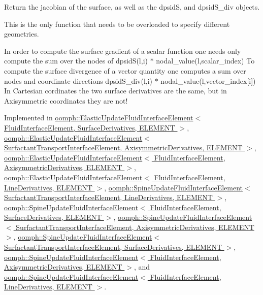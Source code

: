 Return the jacobian of the surface, as well as the dpsidS, and dpsid\+S\+\_\+div objects.

This is the only function that needs to be overloaded to specify different geometries.

In order to compute the surface gradient of a scalar function one needs only compute the sum over the nodes of dpsid\+S(l,i) $\ast$ nodal\+\_\+value(l,scalar\+\_\+index) To compute the surface divergence of a vector quantity one computes a sum over nodes and coordinate directions dpsid\+S\+\_\+div(l,i) $\ast$ nodal\+\_\+value(l,vector\+\_\+index\mbox{[}i\mbox{]}) In Cartesian cordinates the two surface derivatives are the same, but in Axisymmetric coordinates they are not! 

Implemented in \hyperlink{classoomph_1_1ElasticUpdateFluidInterfaceElement_ae9df6c11ccb63dc04c0d5ca655fe1482}{oomph\+::\+Elastic\+Update\+Fluid\+Interface\+Element$<$ Fluid\+Interface\+Element, Surface\+Derivatives, E\+L\+E\+M\+E\+N\+T $>$}, \hyperlink{classoomph_1_1ElasticUpdateFluidInterfaceElement_ae9df6c11ccb63dc04c0d5ca655fe1482}{oomph\+::\+Elastic\+Update\+Fluid\+Interface\+Element$<$ Surfactant\+Transport\+Interface\+Element, Axisymmetric\+Derivatives, E\+L\+E\+M\+E\+N\+T $>$}, \hyperlink{classoomph_1_1ElasticUpdateFluidInterfaceElement_ae9df6c11ccb63dc04c0d5ca655fe1482}{oomph\+::\+Elastic\+Update\+Fluid\+Interface\+Element$<$ Fluid\+Interface\+Element, Axisymmetric\+Derivatives, E\+L\+E\+M\+E\+N\+T $>$}, \hyperlink{classoomph_1_1ElasticUpdateFluidInterfaceElement_ae9df6c11ccb63dc04c0d5ca655fe1482}{oomph\+::\+Elastic\+Update\+Fluid\+Interface\+Element$<$ Fluid\+Interface\+Element, Line\+Derivatives, E\+L\+E\+M\+E\+N\+T $>$}, \hyperlink{classoomph_1_1SpineUpdateFluidInterfaceElement_a75debcd348674d5ea58bfefc0e72b737}{oomph\+::\+Spine\+Update\+Fluid\+Interface\+Element$<$ Surfactant\+Transport\+Interface\+Element, Line\+Derivatives, E\+L\+E\+M\+E\+N\+T $>$}, \hyperlink{classoomph_1_1SpineUpdateFluidInterfaceElement_a75debcd348674d5ea58bfefc0e72b737}{oomph\+::\+Spine\+Update\+Fluid\+Interface\+Element$<$ Fluid\+Interface\+Element, Surface\+Derivatives, E\+L\+E\+M\+E\+N\+T $>$}, \hyperlink{classoomph_1_1SpineUpdateFluidInterfaceElement_a75debcd348674d5ea58bfefc0e72b737}{oomph\+::\+Spine\+Update\+Fluid\+Interface\+Element$<$ Surfactant\+Transport\+Interface\+Element, Axisymmetric\+Derivatives, E\+L\+E\+M\+E\+N\+T $>$}, \hyperlink{classoomph_1_1SpineUpdateFluidInterfaceElement_a75debcd348674d5ea58bfefc0e72b737}{oomph\+::\+Spine\+Update\+Fluid\+Interface\+Element$<$ Surfactant\+Transport\+Interface\+Element, Surface\+Derivatives, E\+L\+E\+M\+E\+N\+T $>$}, \hyperlink{classoomph_1_1SpineUpdateFluidInterfaceElement_a75debcd348674d5ea58bfefc0e72b737}{oomph\+::\+Spine\+Update\+Fluid\+Interface\+Element$<$ Fluid\+Interface\+Element, Axisymmetric\+Derivatives, E\+L\+E\+M\+E\+N\+T $>$}, and \hyperlink{classoomph_1_1SpineUpdateFluidInterfaceElement_a75debcd348674d5ea58bfefc0e72b737}{oomph\+::\+Spine\+Update\+Fluid\+Interface\+Element$<$ Fluid\+Interface\+Element, Line\+Derivatives, E\+L\+E\+M\+E\+N\+T $>$}.



